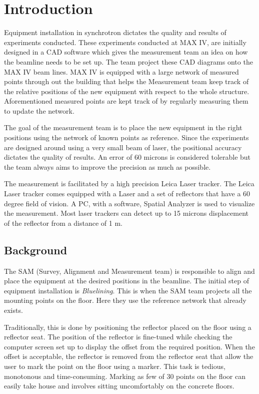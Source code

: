 \documentclass{LTHthesis}
\begin{document}
\chapter{Introduction}
    Equipment installation in synchrotron dictates the quality and results of experiments conducted. These experiments conducted at MAX IV, are initially designed in a CAD software which gives the measurement team an idea on how the beamline needs to be set up. The team project these CAD diagrams onto the MAX IV beam lines. MAX IV is equipped with a large network of measured points through out the building that helps the Measurement team keep track of the relative positions of the new equipment with respect to the whole structure. Aforementioned measured points are kept track of by regularly measuring them to update the network. 
    
    The goal of the measurement team is to place the new equipment in the right positions using the network of known points as reference. Since the experiments are designed around using a very small beam of laser, the positional accuracy dictates the quality of results. 
    An error of 60 microns is considered tolerable but the team always aims to improve the precision as much as possible. 
    
    The measurement is facilitated by a high precision Leica Laser tracker. The Leica Laser tracker comes equipped with a Laser and a set of reflectors that have a 60 degree field of vision. A PC, with a software, Spatial Analyzer is used to visualize the measurement. Most laser trackers can detect up to 15 microns displacement of the reflector from a distance of 1 m. 
    \section{Background} \label{backgroud}
        The SAM (Survey, Alignment and Measurement team) is responsible to align and place the equipment at the desired positions in the beamline. The initial step of equipment installation is \emph{Bluelining}. This is when the SAM team projects all the mounting points on the floor. Here they use the reference network that already exists.
        
        Traditionally, this is done by positioning the reflector placed on the floor using a reflector seat. The position of the reflector is fine-tuned while checking the computer screen set up to display the offset from the required position. When the offset is acceptable, the reflector is removed from the reflector seat that allow the user to mark the point on the floor using a marker. This task is tedious, monotonous and time-consuming. Marking as few of 30 points on the floor can easily take house and involves sitting uncomfortably on the concrete floors. 
        
\end{document}
